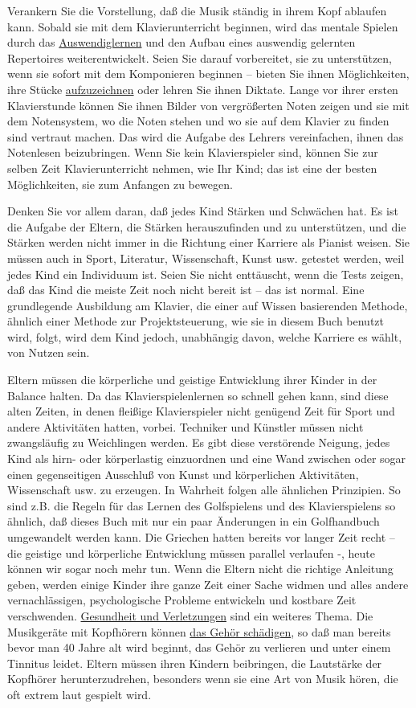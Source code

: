 Verankern Sie die Vorstellung, daß die Musik ständig in ihrem Kopf ablaufen kann.
Sobald sie mit dem Klavierunterricht beginnen, wird das mentale Spielen durch das \hyperref[c1iii6]{Auswendiglernen} und den Aufbau eines auswendig gelernten Repertoires weiterentwickelt.
Seien Sie darauf vorbereitet, sie zu unterstützen, wenn sie sofort mit dem Komponieren beginnen -- bieten Sie ihnen Möglichkeiten, ihre Stücke \hyperref[c1iii13]{aufzuzeichnen} oder lehren Sie ihnen Diktate.
Lange vor ihrer ersten Klavierstunde können Sie ihnen Bilder von vergrößerten Noten zeigen und sie mit dem Notensystem, wo die Noten stehen und wo sie auf dem Klavier zu finden sind vertraut machen.
Das wird die Aufgabe des Lehrers vereinfachen, ihnen das Notenlesen beizubringen.
Wenn Sie kein Klavierspieler sind, können Sie zur selben Zeit Klavierunterricht nehmen, wie Ihr Kind; das ist eine der besten Möglichkeiten, sie zum Anfangen zu bewegen.

Denken Sie vor allem daran, daß jedes Kind Stärken und Schwächen hat.
Es ist die Aufgabe der Eltern, die Stärken herauszufinden und zu unterstützen, und die Stärken werden nicht immer in die Richtung einer Karriere als Pianist weisen.
Sie müssen auch in Sport, Literatur, Wissenschaft, Kunst usw. getestet werden, weil jedes Kind ein Individuum ist.
Seien Sie nicht enttäuscht, wenn die Tests zeigen, daß das Kind die meiste Zeit noch nicht bereit ist -- das ist normal.
Eine grundlegende Ausbildung am Klavier, die einer auf Wissen basierenden Methode, ähnlich einer Methode zur Projektsteuerung, wie sie in diesem Buch benutzt wird, folgt, wird dem Kind jedoch, unabhängig davon, welche Karriere es wählt, von Nutzen sein.

Eltern müssen die körperliche und geistige Entwicklung ihrer Kinder in der Balance halten.
Da das Klavierspielenlernen so schnell gehen kann, sind diese alten Zeiten, in denen fleißige Klavierspieler nicht genügend Zeit für Sport und andere Aktivitäten hatten, vorbei.
Techniker und Künstler müssen nicht zwangsläufig zu Weichlingen werden.
Es gibt diese verstörende Neigung, jedes Kind als hirn- oder körperlastig einzuordnen und eine Wand zwischen oder sogar einen gegenseitigen Ausschluß von Kunst und körperlichen Aktivitäten, Wissenschaft usw. zu erzeugen.
In Wahrheit folgen alle ähnlichen Prinzipien.
So sind z.B. die Regeln für das Lernen des Golfspielens und des Klavierspielens so ähnlich, daß dieses Buch mit nur ein paar Änderungen in ein Golfhandbuch umgewandelt werden kann.
Die Griechen hatten bereits vor langer Zeit recht -- die geistige und körperliche Entwicklung müssen parallel verlaufen -, heute können wir sogar noch mehr tun.
Wenn die Eltern nicht die richtige Anleitung geben, werden einige Kinder ihre ganze Zeit einer Sache widmen und alles andere vernachlässigen, psychologische Probleme entwickeln und kostbare Zeit verschwenden.
\hyperref[c1iii10krank]{Gesundheit und Verletzungen} sind ein weiteres Thema.
Die Musikgeräte mit Kopfhörern können \hyperref[c1iii10gehoer]{das Gehör schädigen}, so daß man bereits bevor man 40 Jahre alt wird beginnt, das Gehör zu verlieren und unter einem Tinnitus leidet.
Eltern müssen ihren Kindern beibringen, die Lautstärke der Kopfhörer herunterzudrehen, besonders wenn sie eine Art von Musik hören, die oft extrem laut gespielt wird.
 

